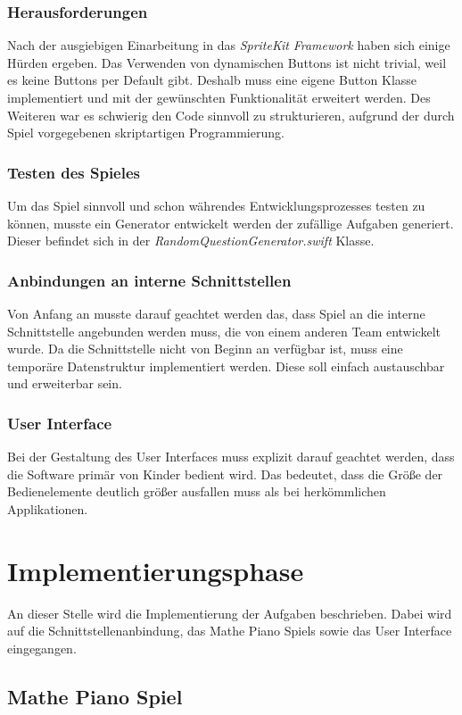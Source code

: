 \subsubsection{Herausforderungen}
Nach der ausgiebigen Einarbeitung in das \textit{SpriteKit} \textit{Framework} haben sich einige Hürden ergeben. Das Verwenden von dynamischen Buttons ist nicht trivial, weil es keine Buttons per Default gibt. Deshalb muss eine eigene Button Klasse implementiert und mit der gewünschten Funktionalität erweitert werden. Des Weiteren war es schwierig den Code sinnvoll zu strukturieren, aufgrund der durch Spiel vorgegebenen skriptartigen Programmierung. 
\subsubsection{Testen des Spieles}
Um das Spiel sinnvoll und schon währendes Entwicklungsprozesses testen zu können, musste ein Generator entwickelt werden der zufällige Aufgaben generiert. Dieser befindet sich in der \textit{RandomQuestionGenerator.swift} Klasse. 
\subsubsection{Anbindungen an interne Schnittstellen}
Von Anfang an musste darauf geachtet werden das, dass Spiel an die interne Schnittstelle angebunden werden muss, die von einem anderen Team entwickelt wurde. Da die Schnittstelle nicht von Beginn an verfügbar ist, muss eine temporäre Datenstruktur implementiert werden. Diese soll einfach austauschbar und erweiterbar sein.
\subsubsection{User Interface}
Bei der Gestaltung des User Interfaces muss explizit darauf geachtet werden, dass die Software primär von Kinder bedient wird. Das bedeutet, dass die Größe der Bedienelemente deutlich größer ausfallen muss als bei herkömmlichen Applikationen.   

\section{Implementierungsphase}
An dieser Stelle wird die Implementierung der Aufgaben beschrieben. Dabei wird auf die Schnittstellenanbindung, das Mathe Piano Spiels sowie das User Interface eingegangen.
\subsection{Mathe Piano Spiel}
